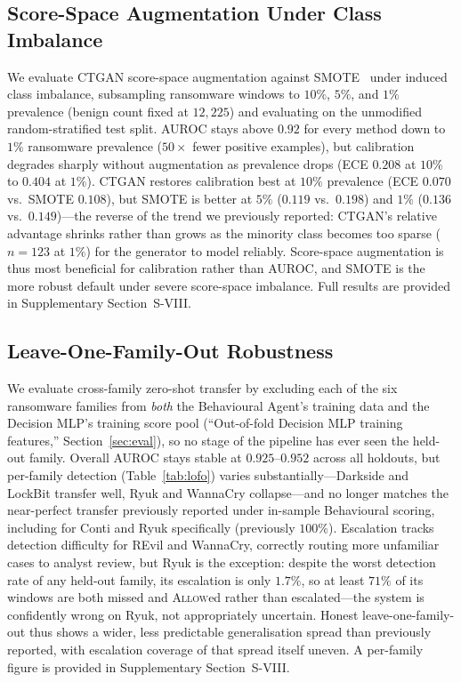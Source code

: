 \documentclass[journal]{IEEEtran}
\begin{document}
\subsection{Score-Space Augmentation Under Class Imbalance}\label{sec:results_imbalance}

We evaluate CTGAN score-space augmentation against SMOTE~\cite{chawla2002smote}
under induced class imbalance, subsampling ransomware windows to $10\%$,
$5\%$, and $1\%$ prevalence (benign count fixed at $12{,}225$) and evaluating
on the unmodified random-stratified test split.
AUROC stays above $0.92$ for every method down to $1\%$ ransomware
prevalence ($50{\times}$ fewer positive examples), but calibration degrades
sharply without augmentation as prevalence drops (ECE $0.208$ at $10\%$ to
$0.404$ at $1\%$). CTGAN restores calibration best at $10\%$ prevalence
(ECE $0.070$ vs.\ SMOTE $0.108$), but SMOTE is better at $5\%$ ($0.119$
vs.\ $0.198$) and $1\%$ ($0.136$ vs.\ $0.149$)---the reverse of the trend
we previously reported: CTGAN's relative advantage shrinks rather than
grows as the minority class becomes too sparse ($n{=}123$ at $1\%$) for the
generator to model reliably. Score-space augmentation is thus most
beneficial for calibration rather than AUROC, and SMOTE is the more robust
default under severe score-space imbalance. Full results are provided in
Supplementary Section~S-VIII.

\subsection{Leave-One-Family-Out Robustness}\label{sec:results_lofo}

We evaluate cross-family zero-shot transfer by excluding each of the six
ransomware families from \emph{both} the Behavioural Agent's training data
and the Decision MLP's training score pool (``Out-of-fold Decision MLP
training features,'' Section~\ref{sec:eval}), so no stage of the pipeline
has ever seen the held-out family. Overall AUROC stays stable at
$0.925$--$0.952$ across all holdouts, but per-family detection
(Table~\ref{tab:lofo}) varies substantially---Darkside and LockBit
transfer well, Ryuk and WannaCry collapse---and no longer matches the
near-perfect transfer previously reported under in-sample Behavioural
scoring, including for Conti and Ryuk specifically (previously $100\%$).
Escalation tracks detection difficulty for REvil and WannaCry, correctly
routing more unfamiliar cases to analyst review, but Ryuk is the
exception: despite the worst detection rate of any held-out family, its
escalation is only $1.7\%$, so at least $71\%$ of its windows are both
missed and \textsc{Allow}ed rather than escalated---the system is
confidently wrong on Ryuk, not appropriately uncertain. Honest
leave-one-family-out thus shows a wider, less predictable generalisation
spread than previously reported, with escalation coverage of that spread
itself uneven. A per-family figure is provided in Supplementary
Section~S-VIII.
\end{document}
